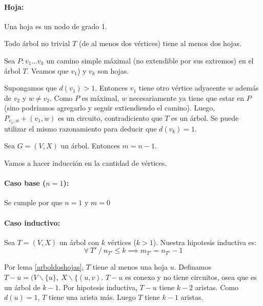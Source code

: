 \paragraph{Hoja:} Una hoja es un nodo de grado 1.

\begin{lema}\label{arboldoshojas}
	Todo árbol no trivial \(T\) (de al menos dos vértices) tiene al menos dos hojas.
\end{lema}
\begin{demo}
	Sea \(P: v_1\dots v_k\) un camino simple máximal (no extendible por sus extremos) en el árbol \(T\). Veamos que \(v_1\)) y \(v_k\) son hojas.

	Supongamos que \(d(v_1) > 1\). Entonces \(v_1\) tiene otro vértice adyacente
	\(w\) además de \(v_2\) y \(w \neq v_2\). Como \(P\) es máximal, \(w\)
	necesariamente ya tiene que estar en \(P\) (sino podriamos agregarlo y seguir extiendiendo el
	camino).
	Luego, \(P_{v_1,w} + (v_1, w)\) es un circuito, contradiciento que \(T\) es un árbol.
	Se puede utilizar el mismo razonamiento para deducir que \(d(v_k) = 1\).
\end{demo}

\begin{lema}\label{arbolcantEjes}
	Sea \(G = (V, X)\) un árbol. Entonces \(m = n - 1\).
\end{lema}
\begin{demo}
	Vamos a hacer inducción en la cantidad de vértices.
	\paragraph{Caso base (\(n = 1\)):} Se cumple por que \(n = 1\) y \(m = 0\)
	\paragraph{Caso inductivo:} Sea \(T = (V, X)\) un árbol con \(k\) vértices (\(k > 1\)). Nuestra hipotesis inductiva es: \[\forall~T' ~/~ n_{T'} \leq k \implies m_{T'} = n_{T'} - 1\]


	Por lema \ref{arboldoshojas}, \(T\) tiene al menos una hoja \(u\). Definamos \(T - u = (V \backslash \{u\},~X\backslash \{(u,v)\). \(T - u\) es conexo y no tiene circuitos, osea que es un árbol de \(k-1\). Por hipotesis inductiva, \(T - u\) tiene \(k-2\) aristas. Como \(d(u) = 1\), \(T\) tiene una arista más. Luego \(T\) tiene \(k-1\) aristas.
\end{demo}


